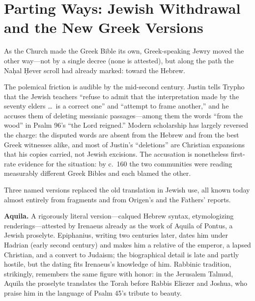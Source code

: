 \section{Parting Ways: Jewish Withdrawal and the New Greek Versions}

As the Church made the Greek Bible its own, Greek-speaking Jewry moved the
other way---not by a single decree (none is attested), but along the path
the Na\d{h}al \d{H}ever scroll had already marked: toward the Hebrew.

The polemical friction is audible by the mid-second century. Justin tells
Trypho that the Jewish teachers ``refuse to admit that the interpretation
made by the seventy elders \ldots\ is a correct one'' and ``attempt to
frame another,'' and he accuses them of deleting messianic passages---among
them the words ``from the wood'' in Psalm 96's ``the Lord reigned.''
Modern scholarship has largely reversed the charge: the disputed words are
absent from the Hebrew and from the best Greek witnesses alike, and most of
Justin's ``deletions'' are Christian expansions that his copies carried,
not Jewish excisions. The accusation is nonetheless first-rate evidence
for the situation: by c.~160 the two communities were reading measurably
different Greek Bibles and each blamed the other.

Three named versions replaced the old translation in Jewish use, all known
today almost entirely from fragments and from Origen's and the Fathers'
reports.

\textbf{Aquila.} A rigorously literal version---calqued Hebrew syntax,
etymologizing renderings---attested by Irenaeus already as the work of
Aquila of Pontus, a Jewish proselyte. Epiphanius, writing two centuries
later, dates him under Hadrian (early second century) and makes him a
relative of the emperor, a lapsed Christian, and a convert to Judaism; the
biographical detail is late and partly hostile, but the dating fits
Irenaeus's knowledge of him. Rabbinic tradition, strikingly, remembers the
same figure with honor: in the Jerusalem Talmud, Aquila the proselyte
translates the Torah before Rabbis Eliezer and Joshua, who praise him in
the language of Psalm 45's tribute to beauty.


